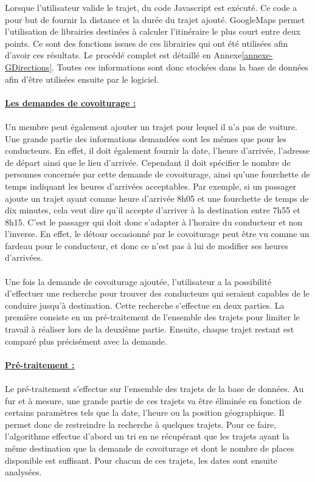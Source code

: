 \documentclass[12pt, a4paper, oneside]{article}
\begin{document}
    Lorsque l'utilisateur valide le trajet, du code Javascript est exécuté. Ce code a pour but de fournir la distance et la durée du trajet ajouté. GoogleMaps permet l'utilisation de librairies destinées à calculer l'itinéraire le plus court entre deux points. Ce sont des fonctions issues de ces librairies qui ont été utilisées afin d'avoir ces résultats. Le procédé complet est détaillé en Annexe\ref{annexe-GDirections}. Toutes ces informations sont donc stockées dans la base de données afin d'être utilisées ensuite par le logiciel.\\\\
    \underline{\textbf{Les demandes de covoiturage :}}\\\\
    \indent Un membre peut également ajouter un trajet pour lequel il n'a pas de voiture. Une grande partie des informations demandées sont les mêmes que pour les conducteurs. En effet, il doit également fournir la date, l'heure d'arrivée, l'adresse de départ ainsi que le lieu d'arrivée. Cependant il doit spécifier le nombre de personnes concernée par cette demande de covoiturage, ainsi qu'une fourchette de temps indiquant les heures d'arrivées acceptables. Par exemple, si un passager ajoute un trajet ayant comme heure d'arrivée 8h05 et une fourchette de temps de dix minutes, cela veut dire qu'il accepte d'arriver à la destination entre 7h55 et 8h15. C'est le passager qui doit donc s'adapter à l'horaire du conducteur et non l'inverse. En effet, le détour occasionné par le covoiturage peut être vu comme un fardeau pour le conducteur, et donc ce n'est pas à lui de modifier ses heures d'arrivées.\\\\
    \indent Une fois la demande de covoiturage ajoutée, l'utilisateur a la possibilité d'effectuer une recherche pour trouver des conducteurs qui seraient capables de le conduire jusqu'à destination. Cette recherche s'effectue en deux parties. La première consiste en un pré-traitement de l'ensemble des trajets pour limiter le travail à réaliser lors de la deuxième partie. Ensuite, chaque trajet restant est comparé plus précisément avec la demande.\\\\
    \underline{\textbf{Pré-traitement :}}\\\\
     \indent Le pré-traitement s'effectue sur l'ensemble des trajets de la base de données. Au fur et à mesure, une grande partie de ces trajets va être éliminée en fonction de certains paramètres tels que la date, l'heure ou la position géographique. Il permet donc de restreindre la recherche à quelques trajets. Pour ce faire, l'algorithme effectue d'abord un tri en ne récupérant que les trajets ayant la même destination que la demande de covoiturage et dont le nombre de places disponible est suffisant. Pour chacun de ces trajets, les dates sont ensuite analysées.\\
\end{document}
